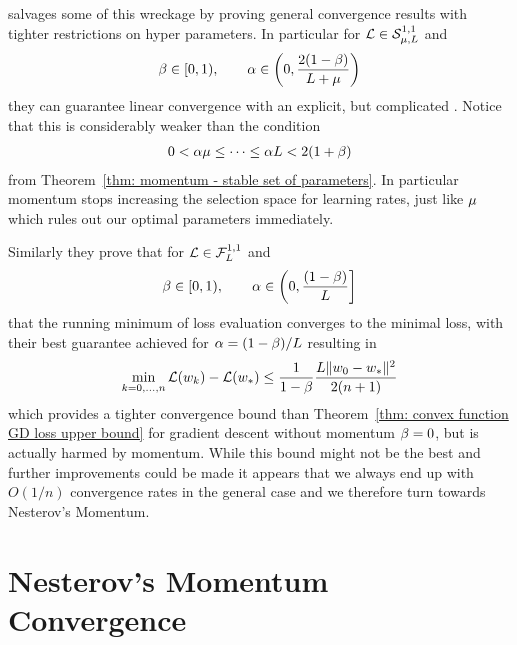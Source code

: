 \textcite{ghadimiGlobalConvergenceHeavyball2015} salvages some of this wreckage
by proving general convergence results with tighter restrictions on hyper
parameters. In particular for \(\mathcal{L}\in\mathcal{S}^{1,1}_{{\mu},{L}}\) and
\begin{align*}
	\beta\in[0,1),
	\qquad \alpha\in \left(0, \frac{2(1-\beta)}{L+\mu}\right)
\end{align*}
they can guarantee linear convergence with an explicit, but complicated
. Notice that this is
considerably weaker than the condition
\begin{align*}
	0<\alpha\mu \le \dots \le \alpha L < 2(1+\beta)
\end{align*}
from Theorem~\ref{thm: momentum - stable set of parameters}. In particular
momentum stops increasing the selection space for learning rates, just like
\(\mu\) which rules out our optimal parameters immediately. 

Similarly they prove that for \(\mathcal{L}\in\mathcal{F}^{1,1}_{L}\) and
\begin{align*}
	\beta\in[0,1),
	\qquad \alpha\in \left(0, \frac{(1-\beta)}{L}\right]
\end{align*}
that the running minimum of loss evaluation converges to the minimal loss,
with their best guarantee achieved for \(\alpha =(1-\beta)/L\)
resulting in
\begin{align*}
	\min_{k=0,\dots,n}\mathcal{L}(w_k) -\mathcal{L}(w_*)
	\le \frac{1}{1-\beta}\frac{L\|w_0-w_*\|^2}{2(n+1)}
\end{align*}
which provides a tighter convergence bound than 
Theorem~\ref{thm: convex function GD loss upper bound} for gradient descent 
without momentum \(\beta=0\), but is actually harmed by momentum. While
this bound might not be the best and further improvements could be made
\parencite[see e.g.][]{sunNonErgodicConvergenceAnalysis2019} it appears that we
always end up with \(O(1/n)\) convergence rates in the general case and we
therefore turn towards Nesterov's Momentum.

\section{Nesterov's Momentum Convergence}\label{sec: nesterov momentum convergence}

